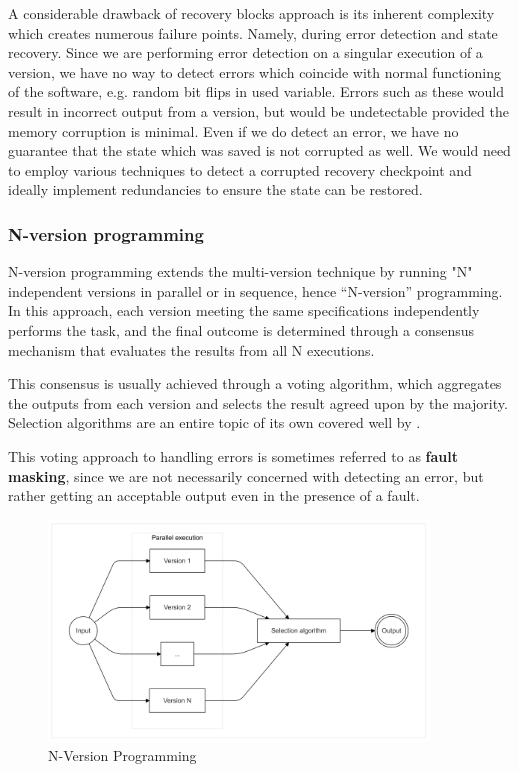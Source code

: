 \documentclass[12pt, letterpaper]{article}
\begin{document}
A considerable drawback of recovery blocks approach is its inherent complexity which creates numerous failure points. Namely, during error detection and state recovery. Since we are performing error detection on a singular execution of a version, we have no way to detect errors which coincide with normal functioning of the software, e.g. random bit flips in used variable. Errors such as these would result in incorrect output from a version, but would be undetectable provided the memory corruption is minimal. Even if we do detect an error, we have no guarantee that the state which was saved is not corrupted as well. We would need to employ various techniques to detect a corrupted recovery checkpoint and ideally implement redundancies to ensure the state can be restored.

\subsubsection{N-version programming}

N-version programming extends the multi-version technique by running "N" independent versions in parallel or in sequence, hence “N-version” programming. In this approach, each version meeting the same specifications independently performs the task, and the final outcome is determined through a consensus mechanism that evaluates the results from all N executions.

This consensus is usually achieved through a voting algorithm, which aggregates the outputs from each version and selects the result agreed upon by the majority. Selection algorithms are an entire topic of its own covered well by \cite{Aljarbouh_2021}.

This voting approach to handling errors is sometimes referred to as \textbf{fault masking}, since we are not necessarily concerned with detecting an error, but rather getting an acceptable output even in the presence of a fault.

\begin{figure}[hbt!]
    \centering
    \includegraphics[width=0.9\textwidth]{n_version_prog/n_version_prog.png}
    \caption{N-Version Programming}
\end{figure}
\end{document}
